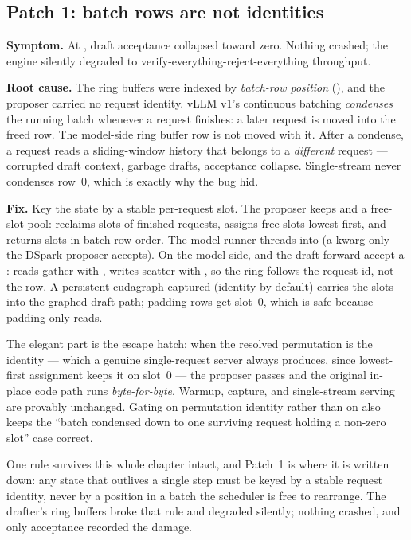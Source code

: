 \subsection{Patch 1: batch rows are not identities}

\textbf{Symptom.} At , draft acceptance collapsed
toward zero. Nothing crashed; the engine silently degraded to
verify-everything-reject-everything throughput.

\textbf{Root cause.} The ring buffers were indexed by \emph{batch-row
position} (), and the proposer carried no
request identity. vLLM v1's continuous batching \emph{condenses} the running
batch whenever a request finishes: a later request is moved into the freed
row. The model-side ring buffer row is not moved with it. After a condense,
a request reads a sliding-window history that belongs to a \emph{different}
request --- corrupted draft context, garbage drafts, acceptance collapse.
Single-stream never condenses row~0, which is exactly why the bug hid.

\textbf{Fix.} Key the state by a stable per-request slot. The proposer keeps
 and a free-slot pool: 
reclaims slots of finished requests, assigns free slots lowest-first, and
returns slots in batch-row order. The model runner threads
 into  (a kwarg only
the DSpark proposer accepts). On the model side,  and the
draft forward accept a : reads gather with
, writes scatter with , so the ring
follows the request id, not the row. A persistent cudagraph-captured
 (identity by default) carries the slots into
the graphed draft path; padding rows get slot~0, which is safe because
padding only reads.

The elegant part is the escape hatch: when the resolved permutation is the
identity --- which a genuine single-request server always produces, since
lowest-first assignment keeps it on slot~0 --- the proposer passes
 and the original in-place code path runs
\emph{byte-for-byte}. Warmup, capture, and single-stream serving are
provably unchanged. Gating on permutation identity rather than on
 also keeps the ``batch condensed down to one surviving
request holding a non-zero slot'' case correct.

One rule survives this whole chapter intact, and Patch~1 is where it is
written down: any state that outlives a single step must be keyed by a stable
request identity, never by a position in a batch the scheduler is free to
rearrange. The drafter's ring buffers broke that rule and degraded silently;
nothing crashed, and only acceptance recorded the damage.

